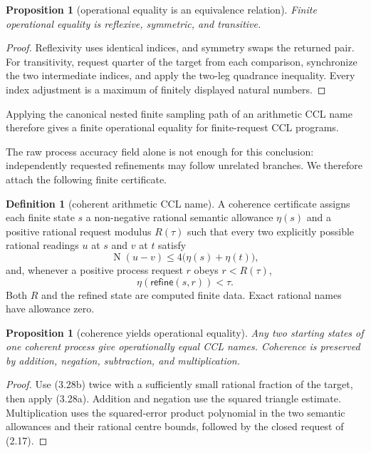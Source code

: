\documentclass[10pt]{article}
\newtheorem{proposition}[theorem]{Proposition}
\theoremstyle{definition}
\newtheorem{definition}[theorem]{Definition}
\theoremstyle{remark}
\newcommand{\Norm}{\operatorname{N}}
\begin{document}
\begin{proposition}[operational equality is an equivalence relation]
Finite operational equality is reflexive, symmetric, and transitive.
\end{proposition}

\begin{proof}
Reflexivity uses identical indices, and symmetry swaps the returned pair.
For transitivity, request quarter of the target from each comparison,
synchronize the two intermediate indices, and apply the two-leg quadrance
inequality.  Every index adjustment is a maximum of finitely displayed
natural numbers.
\end{proof}

Applying the canonical nested finite sampling path of an arithmetic CCL name
therefore gives a finite operational equality for finite-request CCL
programs.

The raw process accuracy field alone is not enough for this conclusion:
independently requested refinements may follow unrelated branches.  We
therefore attach the following finite certificate.

\begin{definition}[coherent arithmetic CCL name]
A coherence certificate assigns each finite
state $s$ a non-negative rational semantic allowance $\eta(s)$ and a positive
rational request modulus $R(\tau)$ such that every two explicitly possible
rational readings $u$ at $s$ and $v$ at $t$ satisfy
\[
 \Norm(u-v)\le 4\bigl(\eta(s)+\eta(t)\bigr),
 \tag{3.28a}
\]
and, whenever a positive process request $r$ obeys $r<R(\tau)$,
\[
 \eta(\mathsf{refine}(s,r))<\tau.
\tag{3.28b}
\]
Both $R$ and the refined state are computed finite data.  Exact rational
names have allowance zero.
\end{definition}

\begin{proposition}[coherence yields operational equality]
Any two starting states of one coherent process give operationally equal CCL
names.  Coherence is preserved by addition, negation, subtraction, and
multiplication.
\end{proposition}

\begin{proof}
Use (3.28b) twice with a sufficiently small rational fraction of the target,
then apply (3.28a).  Addition and negation use the squared triangle estimate.
Multiplication uses the squared-error product polynomial in the two semantic
allowances and their rational centre bounds, followed by the closed request
of (2.17).
\end{proof}
\end{document}
